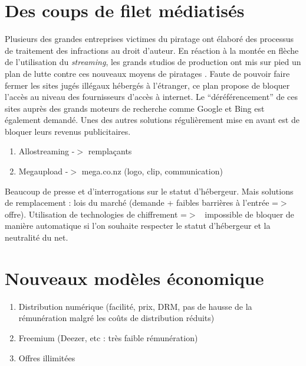 \documentclass[a4paper]{report}
\begin{document}
	\section{Des coups de filet médiatisés}
	Plusieurs des grandes entreprises victimes du piratage ont élaboré des processus de traitement des infractions au droit d'auteur. En réaction à la montée en flèche de l'utilisation du \emph{streaming}, les grands studios de production ont mis sur pied un plan de lutte contre ces nouveaux moyens de piratages \cite{lutte-streaming}. Faute de pouvoir faire fermer les sites jugés illégaux hébergés à l'étranger, ce plan propose de bloquer l'accès au niveau des fournisseurs d'accès à internet. Le ``déréférencement'' de ces sites auprès des grands moteurs de recherche comme Google et Bing est également demandé. Unes des autres solutions régulièrement mise en avant est de bloquer leurs revenus publicitaires.\\

	\begin{enumerate}
		\item Allostreaming -$>$ remplaçants
		\item Megaupload -$>$ mega.co.nz (logo, clip, communication)
	\end{enumerate}
	Beaucoup de presse et d'interrogations sur le statut d'hébergeur. Mais solutions de remplacement : lois du marché (demande + faibles barrières à l'entrée =$>$ offre).
	Utilisation de technologies de chiffrement =$>$ ~impossible de bloquer de manière automatique si l'on souhaite respecter le statut d'hébergeur et la neutralité du net.

	\section{Nouveaux modèles économique}
	\begin{enumerate}
		\item Distribution numérique (facilité, prix, DRM, pas de hausse de la rémunération malgré les coûts de distribution réduits)
		\item Freemium (Deezer, etc : très faible rémunération)
		\item Offres illimitées
	\end{enumerate}
\end{document}

